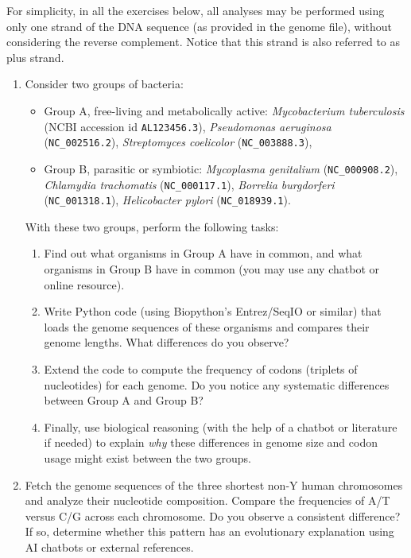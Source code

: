 For simplicity, in all the exercises below, all analyses may be performed using only one strand of the DNA sequence (as provided in the genome file), without considering the reverse complement. Notice that this strand is also referred to as plus strand.

\begin{enumerate}
\item Consider two groups of bacteria: 
\begin{itemize}
\item Group A, free-living and metabolically active: \textit{Mycobacterium tuberculosis} (NCBI accession id \texttt{AL123456.3}), \textit{Pseudomonas aeruginosa} (\texttt{NC\_002516.2}), \textit{Streptomyces coelicolor} (\texttt{NC\_003888.3}),
\item Group B, parasitic or symbiotic: \textit{Mycoplasma genitalium} (\texttt{NC\_000908.2}), \textit{Chlamydia trachomatis} (\texttt{NC\_000117.1}), \textit{Borrelia burgdorferi} (\texttt{NC\_001318.1}), \textit{Helicobacter pylori} (\texttt{NC\_018939.1}).
\end{itemize}
With these two groups, perform the following tasks:
\begin{enumerate}
\item Find out what organisms in Group A have in common, and what organisms in Group B have in common (you may use any chatbot or online resource).
\item Write Python code (using Biopython's Entrez/SeqIO or similar) that loads the genome sequences of these organisms and compares their genome lengths. What differences do you observe?
\item Extend the code to compute the frequency of codons (triplets of nucleotides) for each genome. Do you notice any systematic differences between Group A and Group B?
\item Finally, use biological reasoning (with the help of a chatbot or literature if needed) to explain \textit{why} these differences in genome size and codon usage might exist between the two groups.
\end{enumerate}

\item Fetch the genome sequences of the three shortest non-Y human chromosomes and analyze their nucleotide composition. Compare the frequencies of A/T versus C/G across each chromosome. Do you observe a consistent difference? If so, determine whether this pattern has an evolutionary explanation using AI chatbots or external references.


\end{enumerate}
